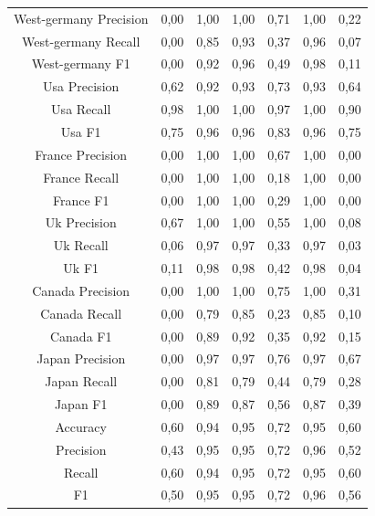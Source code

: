 \documentclass{classrep}
\begin{document}
\begin{table}[h!]
\begin{tabular}{c c c c c c c}
\hline
West-germany Precision 	& 0,00 & 1,00 & 1,00 & 0,71 & 1,00 & 0,22\\
West-germany Recall 		& 0,00 & 0,85 & 0,93 & 0,37 & 0,96 & 0,07\\
West-germany F1		& 0,00 & 0,92 & 0,96 & 0,49 & 0,98 & 0,11\\
\hline
Usa Precision 			& 0,62 & 0,92 & 0,93 & 0,73 & 0,93 & 0,64\\
Usa Recall				& 0,98 & 1,00 & 1,00 & 0,97 & 1,00 & 0,90\\
Usa F1			 	& 0,75 & 0,96 & 0,96 & 0,83 & 0,96 & 0,75\\
\hline
France Precision 		& 0,00 & 1,00 & 1,00 & 0,67 & 1,00 & 0,00\\
France Recall 			& 0,00 & 1,00 & 1,00 & 0,18 & 1,00 & 0,00\\
France F1 				& 0,00 & 1,00 & 1,00 & 0,29 & 1,00 & 0,00\\
\hline
Uk Precision 			& 0,67 & 1,00 & 1,00 & 0,55 & 1,00 & 0,08\\
Uk Recall 				& 0,06 & 0,97 & 0,97 & 0,33 & 0,97 & 0,03\\
Uk F1 				& 0,11 & 0,98 & 0,98 & 0,42 & 0,98 & 0,04\\
\hline
Canada Precision		& 0,00 & 1,00 & 1,00 & 0,75 & 1,00 & 0,31\\
Canada Recall 			& 0,00 & 0,79 & 0,85 & 0,23 & 0,85 & 0,10\\
Canada F1 			& 0,00 & 0,89 & 0,92 & 0,35 & 0,92 & 0,15\\
\hline
Japan Precision 		& 0,00 & 0,97 & 0,97 & 0,76 & 0,97 & 0,67\\
Japan Recall 			& 0,00 & 0,81 & 0,79 & 0,44 & 0,79 & 0,28\\
Japan F1 				& 0,00 & 0,89 & 0,87 & 0,56 & 0,87 & 0,39\\
\hline
Accuracy 				& 0,60 & 0,94 & 0,95 & 0,72 & 0,95 & 0,60\\
Precision 				& 0,43 & 0,95 & 0,95 & 0,72 & 0,96 & 0,52\\
Recall 				& 0,60 & 0,94 & 0,95 & 0,72 & 0,95 & 0,60\\
F1 					& 0,50 & 0,95 & 0,95 & 0,72 & 0,96 & 0,56\\

\end {tabular}
\label {Wyniki klasyfikacji dla różnych podzbiorów cech.}
\end{table}
\end{document}
